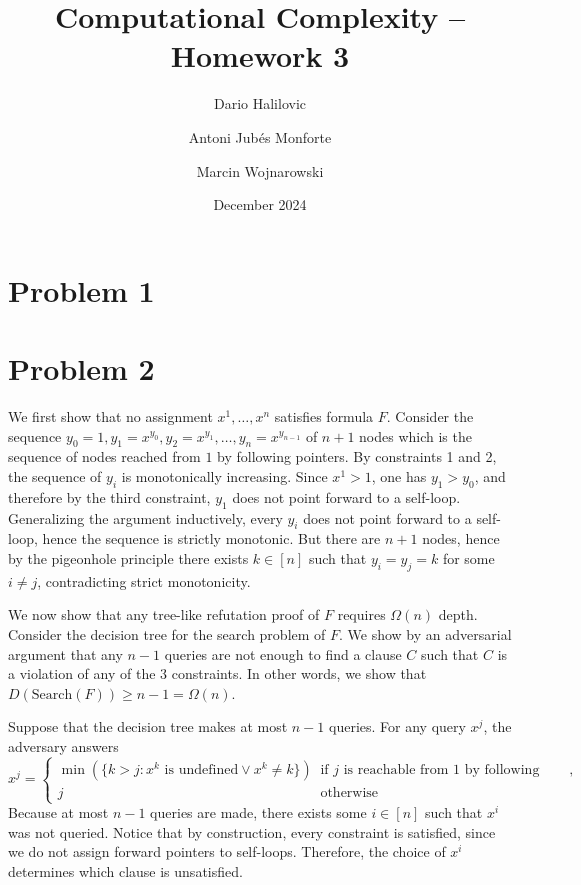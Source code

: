 \documentclass{article}
\title{Computational Complexity -- Homework 3}
\author{Dario Halilovic\and
Antoni Jubés Monforte\and
Marcin Wojnarowski}
\date{December 2024}
\begin{document}
\maketitle

\section*{Problem 1}

\section*{Problem 2}

We first show that no assignment $x^{1}, \ldots, x^{n}$
satisfies formula $F$. Consider the sequence $y_0 = 1, y_1 = x^{y_0}, y_2
= x^{y_1}, \ldots, y_{n} = x^{y_{n-1}}$ of $n+1$ nodes which is the sequence of
nodes reached from $1$ by following pointers. By constraints 1 and 2, the
sequence of $y_i$ is monotonically increasing. Since $x^1 > 1$, one has $y_1
> y_0$, and therefore by the third constraint, $y_1$ does not point forward to
a self-loop. Generalizing the argument inductively, every $y_i$ does not point
forward to a self-loop, hence the sequence is strictly monotonic. But there are
$n+1$ nodes, hence by the pigeonhole principle there exists $k \in [n]$ such
that $y_i = y_j = k$ for some $i \neq j$, contradicting strict monotonicity.

We now show that any tree-like refutation proof of $F$ requires $\Omega(n)$
depth. Consider the decision tree for the search problem of $F$. We show by an
adversarial argument that any $n - 1$ queries are not enough to find a clause
$C$ such that $C$ is a violation of any of the 3 constraints. In other words, we
show that $D(\textrm{Search}(F)) \geq n - 1 = \Omega(n)$.

Suppose that the decision tree makes at most $n - 1$ queries. For any query
$x^{j}$, the adversary answers \[ x^j = \begin{cases} \min(\{k > j : x^k
	\textrm{ is undefined} \lor x^k \neq k\}) & \textrm{if } j \textrm{ is
	reachable from 1 by following pointers}, \\ j     & \textrm{otherwise}
\end{cases} \] Because at most $n - 1$ queries are made, there exists some $i
\in [n]$ such that $x^i$ was not queried. Notice that by construction, every
constraint is satisfied, since we do not assign forward pointers to self-loops.
Therefore, the choice of $x^i$ determines which clause is unsatisfied.
\end{document}
